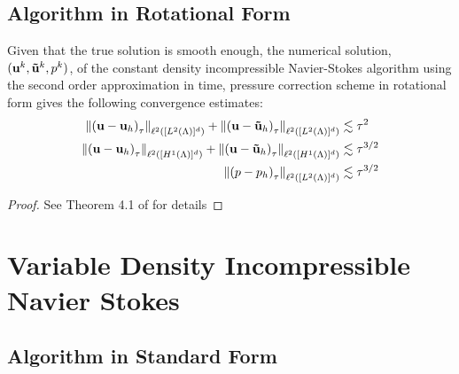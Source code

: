 \documentclass[letterpaper]{erdc}
\begin{document}
%
%
\subsection{Algorithm in Rotational Form}

\begin{theorem}
Given that the true solution is smooth enough, the numerical solution, $(\textbf{u}^k, \mathbf{\tilde{u}}^k, p^k)$, of the constant density incompressible Navier-Stokes algorithm using the second order approximation in time, pressure correction scheme in rotational form gives the following convergence estimates:
\begin{align*}
\left\| \left(\textbf{u} - \textbf{u}_h\right)_{\tau} \right\|_{\ell^2\left([L^2(\Lambda)]^d \right)} + \left\| \left(\textbf{u} - \mathbf{\tilde{u}}_h\right)_{\tau} \right\|_{\ell^2\left([L^2(\Lambda)]^d \right)} &\lesssim \tau^2\\
\left\| \left(\textbf{u} - \textbf{u}_h\right)_{\tau} \right\|_{\ell^2\left([H^1(\Lambda)]^d \right)} + \left\| \left(\textbf{u} - \mathbf{\tilde{u}}_h\right)_{\tau} \right\|_{\ell^2\left([H^1(\Lambda)]^d \right)}  &\lesssim \tau^{3/2}\\
 \left\| \left(p - p_h\right)_{\tau} \right\|_{\ell^2\left([L^2(\Lambda)]^d \right)} &\lesssim \tau^{3/2}
\end{align*}

\end{theorem}
\begin{proof}
See Theorem 4.1 of \cite{guermond2004error} for details
\end{proof}


%
%
%
\section{Variable Density Incompressible Navier Stokes}

%
%
\subsection{Algorithm in Standard Form}
\end{document}
